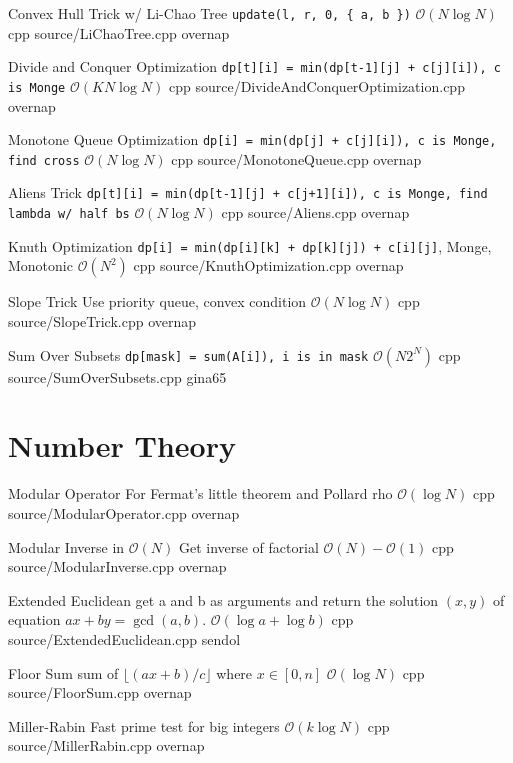 \documentclass[landscape, 10pt, a4paper, oneside, twocolumn]{extarticle}
\begin{document}
\Algorithm
{Convex Hull Trick w/ Li-Chao Tree}
{\texttt{update(l, r, 0, \{ a, b \})}}
{$\mathcal{O}(N\log{N})$}
{cpp}
{source/LiChaoTree.cpp}
{overnap}

\Algorithm
{Divide and Conquer Optimization}
{\texttt{dp[t][i] = min(dp[t-1][j] + c[j][i]), c is Monge}}
{$\mathcal{O}(KN\log{N})$}
{cpp}
{source/DivideAndConquerOptimization.cpp}
{overnap}

\Algorithm
{Monotone Queue Optimization}
{\texttt{dp[i] = min(dp[j] + c[j][i]), c is Monge, find cross}}
{$\mathcal{O}(N\log{N})$}
{cpp}
{source/MonotoneQueue.cpp}
{overnap}

\Algorithm
{Aliens Trick}
{\texttt{dp[t][i] = min(dp[t-1][j] + c[j+1][i]), c is Monge, find lambda w/ half bs}}
{$\mathcal{O}(N\log{N})$}
{cpp}
{source/Aliens.cpp}
{overnap}

\Algorithm
{Knuth Optimization}
{\texttt{dp[i] = min(dp[i][k] + dp[k][j]) + c[i][j]}, Monge, Monotonic}
{$\mathcal{O}(N^2)$}
{cpp}
{source/KnuthOptimization.cpp}
{overnap}

\Algorithm
{Slope Trick}
{Use priority queue, convex condition}
{$\mathcal{O}(N\log{N})$}
{cpp}
{source/SlopeTrick.cpp}
{overnap}

\Algorithm
{Sum Over Subsets}
{\texttt{dp[mask] = sum(A[i]), i is in mask}}
{$\mathcal{O}(N2^N)$}
{cpp}
{source/SumOverSubsets.cpp}
{gina65}


\section{Number Theory}

\Algorithm
{Modular Operator}
{For Fermat's little theorem and Pollard rho}
{$\mathcal{O}(\log{N})$}
{cpp}
{source/ModularOperator.cpp}
{overnap}

\Algorithm
{Modular Inverse in $\mathcal{O}(N)$}
{Get inverse of factorial}
{$\mathcal{O}(N)-\mathcal{O}(1)$}
{cpp}
{source/ModularInverse.cpp}
{overnap}

\Algorithm
{Extended Euclidean}
{get a and b as arguments and return the solution $(x, y)$ of equation $ax + by = \gcd(a, b)$.}
{$\mathcal{O}(\log{a} + \log{b})$}
{cpp}
{source/ExtendedEuclidean.cpp}
{sendol}

\Algorithm
{Floor Sum}
{sum of $\lfloor(ax + b)/c\rfloor$ where $x \in [0, n]$}
{$\mathcal{O}(\log{N})$}
{cpp}
{source/FloorSum.cpp}
{overnap}

\Algorithm
{Miller-Rabin}
{Fast prime test for big integers}
{$\mathcal{O}(k\log{N})$}
{cpp}
{source/MillerRabin.cpp}
{overnap}
\end{document}
